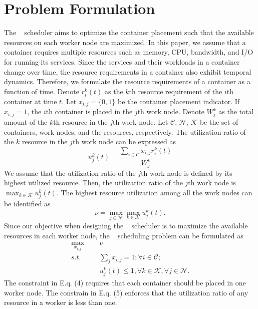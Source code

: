 \section{Problem Formulation}
The \sol~ scheduler aims to optimize the container placement such that the available
resources on each worker node are maximized. In this paper, we assume that a container requires multiple resources such as memory, CPU, bandwidth, and I/O for running its services. Since the services and their workloads in a container change over time, the resource requirements in a container also exhibit temporal
dynamics. Therefore, we formulate the resource requirements of a container as a function of time.
Denote $r_i^{k}(t)$ as the $k$th resource requirement of the $i$th container at time $t$. Let $x_{i,j}=\{0, 1\}$ be the container placement indicator.
If $x_{i,j}=1$, the $i$th container is placed in the $j$th work node. Denote $W_j^k$ as the total amount of the $k$th
resource in the $j$th work node. Let $\mathcal{C}$, $\mathcal{N}$, $\mathcal{K}$ be the set of containers, work nodes,
and the resources, respectively. The utilization ratio of the $k$ resource in the $j$th work node can be expressed as
\begin{equation}\label{eq:work_util_ratio}
  u^k_j(t)=\frac{\sum_{i\in\mathcal{C}}x_{i,j}r_i^{k}(t)}{W_j^k}
\end{equation}
We assume that the utilization ratio of the $j$th work node is defined by its highest utilized resource.
Then, the utilization ratio of the $j$th work node is $\max_{k\in\mathcal{K}}u^k_j(t)$.
The highest resource utilization among all the work nodes can be identified as
\begin{equation}\label{eq:util_worker}
  \nu=\max_{j\in\mathcal{N}}\max_{k\in\mathcal{K}}u^k_j(t).
\end{equation}
Since our objective when designing the \sol~ scheduler is to maximize the available
resources in each worker node, the \sol~ scheduling problem can be formulated as
\begin{align}\label{eq:sched_problem}
  \max_{x_{i,j}} &\;\;\;\;\; \nu \\
  s.t. &\;\;\;\;\; \sum_j x_{i,j}=1;\forall i\in\mathcal{C};\\
       &\;\;\;\;\; u^k_j(t)\leq 1, \forall k\in\mathcal{K}, \forall j\in\mathcal{N}.
\end{align}
The constraint in E.q. (4) requires that each container should be placed in
one worker node. The constrain in E.q. (5) enforces that the utilization ratio of any resource in a worker is less than one.
